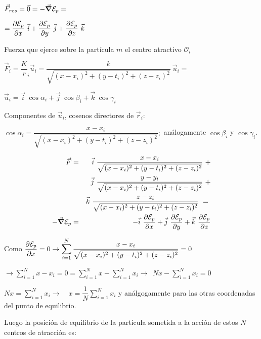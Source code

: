 $\vec F_{res}=\vec 0=-\vec {\grad} \mathcal E_p= $

$=\displaystyle \pdv{\mathcal E_p}{x} \ \vec i + \pdv{\mathcal E_p}{y} \ \vec j + \pdv{\mathcal E_p}{z} \ \vec k $

Fuerza que ejerce sobre la partícula $m$ el centro atractivo $\mathcal O_i$

$\vec F_i=\dfrac K r_i \vec u_i = \dfrac k {\sqrt{(x-x_i)^2+(y-t_i)^2+(z-z_i)^2}} \ \vec u_i=$

$\vec u_i= \vec i \ \cos \alpha_i + \vec j \ \cos \beta_i + \vec k \ \cos \gamma_i$

Componentes de $\vec u_i$, cosenos directores de $\vec r_i$:

$\cos \alpha_i=\dfrac {x-x_i}{\sqrt{(x-x_i)^2+(y-t_i)^2+(z-z_i)^2}}; $ análogamente $\cos \beta_i$ y $\cos \gamma_i$.

\begin{eqnarray*}
\vec F & = & \vec i \ \dfrac {x-x_i}{\sqrt{(x-x_i)^2+(y-t_i)^2+(z-z_i)^2}} \ +  \nonumber \\
    & & \vec j \ \dfrac {y-y_i}{\sqrt{(x-x_i)^2+(y-t_i)^2+(z-z_i)^2}} \ + \nonumber \\
  & & \vec k \ \dfrac {z-z_i}{\sqrt{(x-x_i)^2+(y-t_i)^2+(z-z_i)^2}}  \ = \ \nonumber \\
  -\vec{\grad} \mathcal E_p &= & -\vec i \ \pdv{\mathcal E_p}{x}+ \vec j \ \pdv{\mathcal E_p}{y}+ \vec k \ \pdv{\mathcal E_p}{z}
\end{eqnarray*}


Como $\displaystyle \pdv{\mathcal E_p}{x}=0 \to \sum_{i=1}^N 
\dfrac {x-x_i}{\sqrt{(x-x_i)^2+(y-t_i)^2+(z-z_i)^2}}=0$

$\displaystyle  \to \sum_{i=1}^N x-x_i=0=\sum_{i=1}^N x - \sum_{i=1}^N x_i \to \ \ Nx-\sum_{i=1}^N x_i=0$

$\displaystyle Nx=\sum_{i=1}^N x_i \to \quad x=\dfrac 1 N \sum_{i=1}^N x_i$ y análgogamente para las otras coordenadas del punto de equilibrio.


Luego la posición de equilibrio de la partícula sometida a la acción de estos $N$ centros de atracción es:

